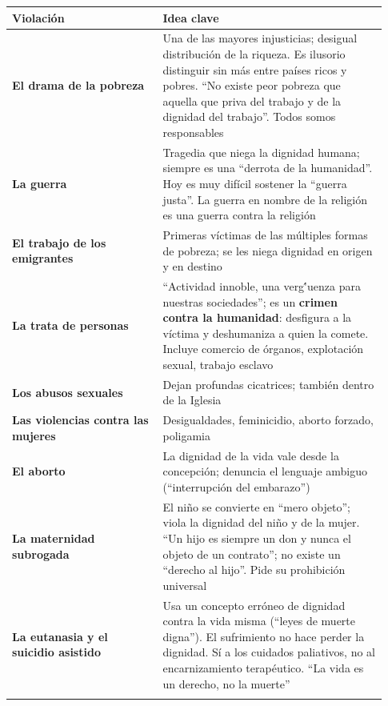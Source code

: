 \documentclass[10pt,a4paper]{article}
\begin{document}
{\small\renewcommand{\arraystretch}{1.25}
\begin{longtable}{>{\raggedright\arraybackslash}p{0.375\linewidth}>{\raggedright\arraybackslash}p{0.555\linewidth}}
\toprule
\textbf{Violación} & \textbf{Idea clave} \\ \midrule \endhead
\textbf{El drama de la pobreza} & Una de las mayores injusticias; desigual distribución de la riqueza. Es ilusorio distinguir sin más entre países ricos y pobres. ``No existe peor pobreza que aquella que priva del trabajo y de la dignidad del trabajo''. Todos somos responsables \\ \addlinespace[2pt]
\textbf{La guerra} & Tragedia que niega la dignidad humana; siempre es una ``derrota de la humanidad''. Hoy es muy difícil sostener la ``guerra justa''. La guerra en nombre de la religión es una guerra contra la religión \\ \addlinespace[2pt]
\textbf{El trabajo de los emigrantes} & Primeras víctimas de las múltiples formas de pobreza; se les niega dignidad en origen y en destino \\ \addlinespace[2pt]
\textbf{La trata de personas} & ``Actividad innoble, una verg\''uenza para nuestras sociedades''; es un \textbf{crimen contra la humanidad}: desfigura a la víctima y deshumaniza a quien la comete. Incluye comercio de órganos, explotación sexual, trabajo esclavo \\ \addlinespace[2pt]
\textbf{Los abusos sexuales} & Dejan profundas cicatrices; también dentro de la Iglesia \\ \addlinespace[2pt]
\textbf{Las violencias contra las mujeres} & Desigualdades, feminicidio, aborto forzado, poligamia \\ \addlinespace[2pt]
\textbf{El aborto} & La dignidad de la vida vale desde la concepción; denuncia el lenguaje ambiguo (``interrupción del embarazo'') \\ \addlinespace[2pt]
\textbf{La maternidad subrogada} & El niño se convierte en ``mero objeto''; viola la dignidad del niño y de la mujer. ``Un hijo es siempre un don y nunca el objeto de un contrato''; no existe un ``derecho al hijo''. Pide su prohibición universal \\ \addlinespace[2pt]
\textbf{La eutanasia y el suicidio asistido} & Usa un concepto erróneo de dignidad contra la vida misma (``leyes de muerte digna''). El sufrimiento no hace perder la dignidad. Sí a los cuidados paliativos, no al encarnizamiento terapéutico. ``La vida es un derecho, no la muerte'' \\ \addlinespace[2pt]

\end{longtable}}
\end{document}
